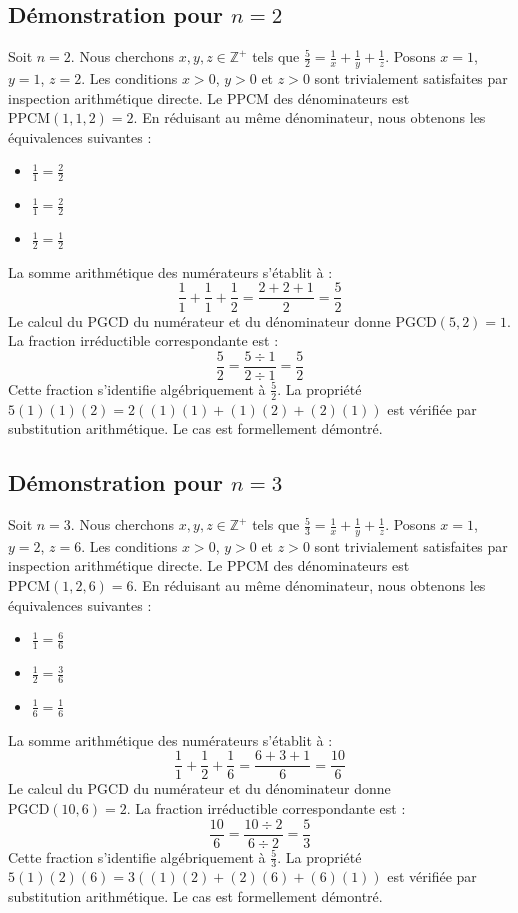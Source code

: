 \documentclass[12pt,a4paper]{article}
\begin{document}
\subsection{Démonstration pour $n = 2$}
Soit $n = 2$. Nous cherchons $x, y, z \in \mathbb{Z}^{+}$ tels que $\frac{5}{2} = \frac{1}{x} + \frac{1}{y} + \frac{1}{z}$.
Posons $x = 1$, $y = 1$, $z = 2$.
Les conditions $x > 0$, $y > 0$ et $z > 0$ sont trivialement satisfaites par inspection arithmétique directe.
Le PPCM des dénominateurs est $\text{PPCM}(1, 1, 2) = 2$.
En réduisant au même dénominateur, nous obtenons les équivalences suivantes :
\begin{itemize}
    \item $\frac{1}{1} = \frac{2}{2}$
    \item $\frac{1}{1} = \frac{2}{2}$
    \item $\frac{1}{2} = \frac{1}{2}$
\end{itemize}
La somme arithmétique des numérateurs s'établit à :
$$ \frac{1}{1} + \frac{1}{1} + \frac{1}{2} = \frac{2 + 2 + 1}{2} = \frac{5}{2} $$
Le calcul du PGCD du numérateur et du dénominateur donne $\text{PGCD}(5, 2) = 1$.
La fraction irréductible correspondante est :
$$ \frac{5}{2} = \frac{5 \div 1}{2 \div 1} = \frac{5}{2} $$
Cette fraction s'identifie algébriquement à $\frac{5}{2}$.
La propriété $5(1)(1)(2) = 2((1)(1) + (1)(2) + (2)(1))$ est vérifiée par substitution arithmétique.
Le cas est formellement démontré.

\subsection{Démonstration pour $n = 3$}
Soit $n = 3$. Nous cherchons $x, y, z \in \mathbb{Z}^{+}$ tels que $\frac{5}{3} = \frac{1}{x} + \frac{1}{y} + \frac{1}{z}$.
Posons $x = 1$, $y = 2$, $z = 6$.
Les conditions $x > 0$, $y > 0$ et $z > 0$ sont trivialement satisfaites par inspection arithmétique directe.
Le PPCM des dénominateurs est $\text{PPCM}(1, 2, 6) = 6$.
En réduisant au même dénominateur, nous obtenons les équivalences suivantes :
\begin{itemize}
    \item $\frac{1}{1} = \frac{6}{6}$
    \item $\frac{1}{2} = \frac{3}{6}$
    \item $\frac{1}{6} = \frac{1}{6}$
\end{itemize}
La somme arithmétique des numérateurs s'établit à :
$$ \frac{1}{1} + \frac{1}{2} + \frac{1}{6} = \frac{6 + 3 + 1}{6} = \frac{10}{6} $$
Le calcul du PGCD du numérateur et du dénominateur donne $\text{PGCD}(10, 6) = 2$.
La fraction irréductible correspondante est :
$$ \frac{10}{6} = \frac{10 \div 2}{6 \div 2} = \frac{5}{3} $$
Cette fraction s'identifie algébriquement à $\frac{5}{3}$.
La propriété $5(1)(2)(6) = 3((1)(2) + (2)(6) + (6)(1))$ est vérifiée par substitution arithmétique.
Le cas est formellement démontré.
\end{document}
